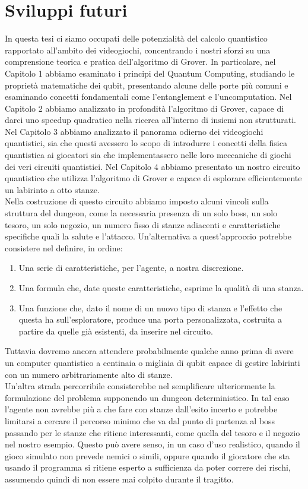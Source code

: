 \documentclass{book}
\theoremstyle{definition}
\theoremstyle{definition}
\theoremstyle{definition}
\theoremstyle{plain}
\theoremstyle{plain}
\theoremstyle{plain}
\theoremstyle{plain}
\begin{document}
\chapter{Sviluppi futuri}
In questa tesi ci siamo occupati delle potenzialità del calcolo quantistico rapportato all'ambito dei videogiochi, concentrando i nostri sforzi su una comprensione teorica e pratica dell'algoritmo di Grover. In particolare, nel Capitolo 1 abbiamo esaminato i principi del Quantum Computing, studiando le proprietà matematiche dei qubit, presentando alcune delle porte più comuni e esaminando concetti fondamentali come l'entanglement e l'uncomputation. Nel Capitolo 2 abbiamo analizzato in profondità l'algoritmo di Grover, capace di darci uno speedup quadratico nella ricerca all'interno di insiemi non strutturati. Nel Capitolo 3 abbiamo analizzato il panorama odierno dei videogiochi quantistici, sia che questi avessero lo scopo di introdurre i concetti della fisica quantistica ai giocatori sia che implementassero nelle loro meccaniche di giochi dei veri circuiti quantistici. Nel Capitolo 4 abbiamo presentato un nostro circuito quantistico che utilizza l'algoritmo di Grover e capace di esplorare efficientemente un labirinto a otto stanze.\\
Nella costruzione di questo circuito abbiamo imposto alcuni vincoli sulla struttura del dungeon, come la necessaria presenza di un solo boss, un solo tesoro, un solo negozio, un numero fisso di stanze adiacenti e caratteristiche specifiche quali la salute e l'attacco. Un'alternativa a quest'approccio potrebbe consistere nel definire, in ordine:
\begin{enumerate}
    \item Una serie di caratteristiche, per l'agente, a nostra discrezione.
    \item Una formula che, date queste caratteristiche, esprime la qualità di una stanza.
    \item Una funzione che, dato il nome di un nuovo tipo di stanza e l'effetto che questa ha sull'esploratore, produce una porta personalizzata, costruita a partire da quelle già esistenti, da inserire nel circuito.
\end{enumerate}
Tuttavia dovremo ancora attendere probabilmente qualche anno prima di avere un computer quantistico a centinaia o migliaia di qubit capace di gestire labirinti con un numero arbitrariamente alto di stanze.\\
Un'altra strada percorribile consisterebbe nel semplificare ulteriormente la formulazione del problema supponendo un dungeon deterministico. In tal caso l'agente non avrebbe più a che fare con stanze dall'esito incerto e potrebbe limitarsi a cercare il percorso minimo che va dal punto di partenza al boss passando per le stanze che ritiene interessanti, come quella del tesoro e il negozio nel nostro esempio. Questo può avere senso, in un caso d'uso realistico, quando il gioco simulato non prevede nemici o simili, oppure quando il giocatore che sta usando il programma si ritiene esperto a sufficienza da poter correre dei rischi, assumendo quindi di non essere mai colpito durante il tragitto.
\end{document}
